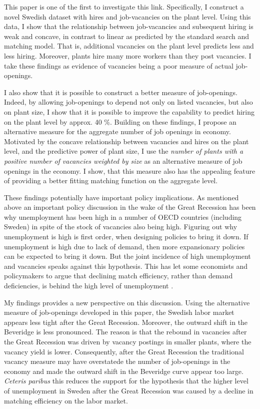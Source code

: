 This paper is one of the first to investigate this link. Specifically, I construct a novel Swedish dataset with hires and job-vacancies on the plant level. Using this data, I show that the relationship between job-vacancies and subsequent hiring is weak and concave, in contrast to linear as predicted by the standard search and matching model. That is, additional vacancies on the plant level predicts less and less hiring. Moreover, plants hire many more workers than they post vacancies.  I take these findings as evidence of vacancies being a poor measure of actual job-openings. 

I also show that it is possible to construct a better measure of job-openings. Indeed, by allowing job-openings to depend not only on listed vacancies, but also on plant size, I show that it is possible to improve the capability to predict hiring on the plant level by approx. 40 \%. Building on these findings, I propose an alternative measure for the aggregate number of job openings in economy. Motivated by the concave relationship between vacancies and hires on the plant level, and the predictive power of plant size, I use the \emph{number of plants with a positive number of vacancies weighted by size} as an alternative measure of job openings in the economy. I show, that this measure also has the appealing feature of providing a better fitting matching function on the aggregate level. 

These findings potentially have  important policy implications. As mentioned above an important policy discussion in the wake of the Great Recession has been why unemployment has been high in a number of OECD countries (including Sweden) in spite of the stock of vacancies also being high. Figuring out why unemployment is high is first order, when designing policies to bring it down. If unemployment is high due to lack of demand, then more expansionary policies can be expected to bring it down. But the joint incidence of high unemployment and vacancies speaks against this hypothesis. This has let some economists and policymakers to argue that declining match efficiency, rather than demand deficiencies, is behind the high level of unemployment \citep{Hall2015, Riksbank2012}.

My findings provides a new perspective on this discussion. Using the alternative measure of job-openings developed in this paper, the Swedish labor market appears less tight after the Great Recession. Moreover, the outward shift in the Beveridge is less pronounced. The reason is that the rebound in vacancies after the Great Recession was driven by vacancy postings in smaller plants, where the vacancy yield is lower. Consequently, after the Great Recession the traditional vacancy measure may have overstatede the number of job-openings in the economy and made the outward shift in the Beveridge curve appear too large. \emph{Ceteris paribus} this reduces the support for the hypothesis that the higher level of unemployment in Sweden after the Great Recession was caused by a decline in matching efficiency on the labor market.

